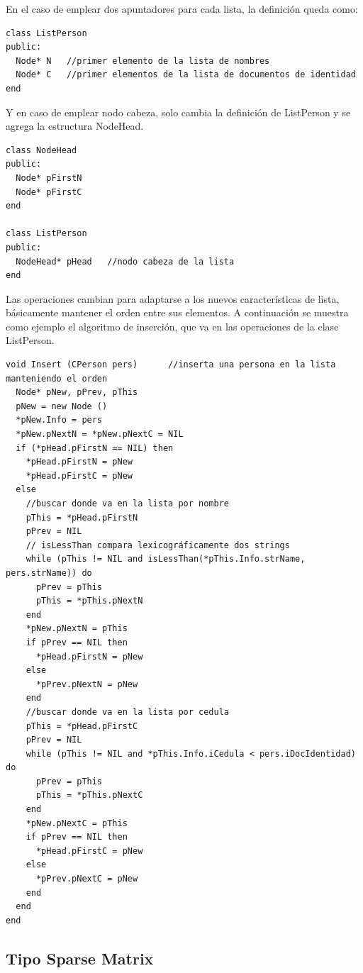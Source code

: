 En el caso de emplear dos apuntadores para cada lista, la definición queda como:

\begin{lstlisting}[upquote=true, language=pseudo]
class ListPerson
public:
  Node* N	//primer elemento de la lista de nombres
  Node* C	//primer elementos de la lista de documentos de identidad
end
\end{lstlisting}

Y en caso de emplear nodo cabeza, solo cambia la definición de ListPerson y se agrega la estructura NodeHead.

\begin{lstlisting}[upquote=true, language=pseudo]
class NodeHead
public:
  Node* pFirstN
  Node* pFirstC
end

class ListPerson
public:
  NodeHead* pHead	//nodo cabeza de la lista
end
\end{lstlisting}

Las operaciones cambian para adaptarse a los nuevos características de lista, básicamente mantener el orden entre sus elementos. A continuación se muestra como ejemplo el algoritmo de inserción, que va en las operaciones de la clase ListPerson.

\begin{lstlisting}[upquote=true, language=pseudo]
void Insert (CPerson pers)		//inserta una persona en la lista manteniendo el orden
  Node* pNew, pPrev, pThis
  pNew = new Node ()
  *pNew.Info = pers
  *pNew.pNextN = *pNew.pNextC = NIL
  if (*pHead.pFirstN == NIL) then
    *pHead.pFirstN = pNew
    *pHead.pFirstC = pNew
  else
    //buscar donde va en la lista por nombre
    pThis = *pHead.pFirstN
    pPrev = NIL
    // isLessThan compara lexicográficamente dos strings
    while (pThis != NIL and isLessThan(*pThis.Info.strName, pers.strName)) do
      pPrev = pThis
      pThis = *pThis.pNextN
    end
    *pNew.pNextN = pThis
    if pPrev == NIL then
      *pHead.pFirstN = pNew
    else
      *pPrev.pNextN = pNew
    end
    //buscar donde va en la lista por cedula
    pThis = *pHead.pFirstC
    pPrev = NIL
    while (pThis != NIL and *pThis.Info.iCedula < pers.iDocIdentidad) do
      pPrev = pThis
      pThis = *pThis.pNextC
    end
    *pNew.pNextC = pThis
    if pPrev == NIL then
      *pHead.pFirstC = pNew
    else
      *pPrev.pNextC = pNew
    end
  end
end
\end{lstlisting}
\subsection{Tipo Sparse Matrix} \label{sec:sparse}

